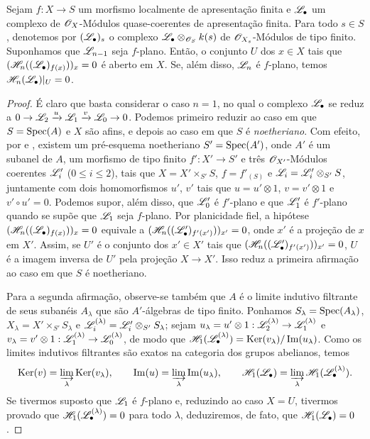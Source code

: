 \begin{proposition}[12.3.3]
\label{IV.12.3.3}
Sejam $f:X\to S$ um morfismo localmente de apresentação finita e
$\mathscr{L}_\bullet$ um complexo de $\mathscr{O}_X$-Módulos quase-coerentes
de apresentação finita. Para todo $s\in S$, denotemos por
$(\mathscr{L}_\bullet)_s$ o complexo
$\mathscr{L}_\bullet\otimes_{\mathscr{O}_S}k(s)$ de
$\mathscr{O}_{X_s}$-Módulos de tipo finito.
Suponhamos que $\mathscr{L}_{n-1}$ seja $f$-plano.
Então, o conjunto $U$ dos $x\in X$ tais que
$(\mathscr{H}_n((\mathscr{L}_\bullet)_{f(x)}))_x=0$ é aberto em $X$.
Se, além disso, $\mathscr{L}_n$ é $f$-plano, temos
$\mathscr{H}_n(\mathscr{L}_\bullet)|_U=0$.
\end{proposition}

\begin{proof}
É claro que basta considerar o caso $n=1$, no qual o complexo
$\mathscr{L}_\bullet$ se reduz a
$0\to\sh{L}_2\xrightarrow{u}\sh{L}_1\xrightarrow{v}\sh{L}_0\to0$.
Podemos primeiro reduzir ao caso em que $S=\operatorname{Spec}(A)$ e $X$
são afins, e depois ao caso em que $S$ é \emph{noetheriano}.
Com efeito, por  e , existem
um pré-esquema noetheriano $S'=\operatorname{Spec}(A')$, onde $A'$ é um subanel
de $A$, um morfismo de tipo finito $f':X'\to S'$ e três
$\mathscr{O}_{X'}$-Módulos coerentes $\mathscr{L}'_i$
($0\leqslant i\leqslant2$), tais que
$X=X'\times_{S'}S$, $f=f'_{(S)}$ e
$\mathscr{L}_i=\mathscr{L}'_i\otimes_{S'}S$, juntamente com dois
homomorfismos $u'$, $v'$ tais que $u=u'\otimes1$,
$v=v'\otimes1$ e $v'\circ u'=0$.
Podemos supor, além disso, que $\mathscr{L}'_0$ é $f'$-plano
 e que $\mathscr{L}'_1$ é $f'$-plano quando
se supõe que $\mathscr{L}_1$ seja $f$-plano.
Por planicidade fiel, a hipótese
$(\mathscr{H}_n((\mathscr{L}_\bullet)_{f(x)}))_x=0$
equivale a
$(\mathscr{H}_n((\mathscr{L}'_\bullet)_{f'(x')}))_{x'}=0$,
onde $x'$ é a projeção de $x$ em $X'$.
Assim, se $U'$ é o conjunto dos $x'\in X'$ tais que
$(\mathscr{H}_n((\mathscr{L}'_\bullet)_{f'(x')}))_{x'}=0$,
$U$ é a imagem inversa de $U'$ pela projeção $X\to X'$.
Isso reduz a primeira afirmação ao caso em que $S$ é noetheriano.

Para a segunda afirmação, observe-se também que $A$ é o limite
indutivo filtrante de seus subanéis $A_\lambda$ que são
$A'$-álgebras de tipo finito. Ponhamos $S_\lambda=\operatorname{Spec}(A_\lambda)$,
$X_\lambda=X'\times_{S'}S_\lambda$ e
$\mathscr{L}^{(\lambda)}_i=\mathscr{L}'_i\otimes_{S'}S_\lambda$; sejam
$u_\lambda=u'\otimes1:\sh{L}_2^{(\lambda)}\to\sh{L}_1^{(\lambda)}$ e
$v_\lambda=v'\otimes1:\sh{L}_1^{(\lambda)}\to\sh{L}_0^{(\lambda)}$,
de modo que
$\mathscr{H}_1(\mathscr{L}_\bullet^{(\lambda)})=\operatorname{Ker}(v_\lambda)/\operatorname{Im}(u_\lambda)$.
Como os limites indutivos filtrantes são exatos na categoria
dos grupos abelianos, temos
\[
\operatorname{Ker}(v)=\varinjlim_\lambda\operatorname{Ker}(v_\lambda),\qquad
\operatorname{Im}(u)=\varinjlim_\lambda\operatorname{Im}(u_\lambda),\qquad
\mathscr{H}_1(\mathscr{L}_\bullet)=\varinjlim_\lambda\mathscr{H}_1(\mathscr{L}_\bullet^{(\lambda)}).
\]
Se tivermos suposto que $\mathscr{L}_1$ é $f$-plano e, reduzindo
ao caso $X=U$, tivermos provado que
$\mathscr{H}_1(\mathscr{L}_\bullet^{(\lambda)})=0$ para todo $\lambda$,
deduziremos, de fato, que $\mathscr{H}_1(\mathscr{L}_\bullet)=0$.


\end{proof}
